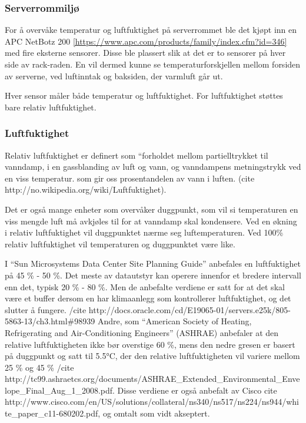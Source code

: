 \subsubsection{Serverrommiljø}

For å overvåke temperatur og luftfuktighet på serverrommet ble det kjøpt inn en APC NetBotz 200 \ref{https://www.apc.com/products/family/index.cfm?id=346} med fire eksterne sensorer. Disse ble plassert slik at det er to sensorer på hver side av rack-raden. En vil dermed kunne se temperaturforskjellen mellom forsiden av serverne, ved luftinntak og baksiden, der varmluft går ut.

Hver sensor måler både temperatur og luftfuktighet. For luftfuktighet støttes bare relativ luftfuktighet.

\subsubsection{Luftfuktighet}

Relativ luftfuktighet er definert som “forholdet mellom partielltrykket til vanndamp, i en gassblanding av luft og vann, og vanndampens metningstrykk ved en viss temperatur. som gir oss prosentandelen av vann i luften. (cite http://no.wikipedia.org/wiki/Luftfuktighet). 

Det er også mange enheter som overvåker duggpunkt, som vil si temperaturen en viss mengde luft må avkjøles til for at vanndamp skal kondensere. Ved en økning i relativ luftfuktighet vil duggpunktet nærme seg luftemperaturen. Ved 100\% relativ luftfuktighet vil temperaturen og duggpunktet være like. 

I “Sun Microsystems Data Center Site Planning Guide” anbefales en luftfuktighet på 45 \% - 50 \%. Det meste av datautstyr kan operere innenfor et bredere intervall enn det, typisk 20 \% - 80 \%. Men de anbefalte verdiene er satt for at det skal være et buffer dersom en har klimaanlegg som kontrollerer luftfuktighet, og det slutter å fungere. /cite http://docs.oracle.com/cd/E19065-01/servers.e25k/805-5863-13/ch3.html\#98939 Andre, som “American Society of Heating, Refrigerating and Air-Conditioning Engineers” (ASHRAE) anbefaler at den relative luftfuktigheten ikke bør overstige 60 \%, mens den nedre gresen er basert på duggpunkt og satt til 5.5°C, der den relative luftfuktigheten vil variere mellom 25 \% og 45 \% /cite http://tc99.ashraetcs.org/documents/ASHRAE\_Extended\_Environmental\_Envelope\_Final\_Aug\_1\_2008.pdf. Disse verdiene er også anbefalt av Cisco cite http://www.cisco.com/en/US/solutions/collateral/ns340/ns517/ns224/ns944/white\_paper\_c11-680202.pdf, og omtalt som vidt akseptert. 

